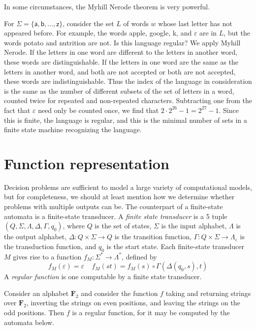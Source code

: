 In some circumstances, the Myhill Nerode theorem is very powerful.

\begin{example}
    For $\Sigma = \{ \mathsf{a, b, }\dots\mathsf{, z} \}$, consider the set $L$ of words $w$ whose last letter has not appeared before. For example, the words \textsf{apple}, \textsf{google}, \textsf{k}, and $\varepsilon$ are in $L$, but the words \textsf{potato} and \textsf{nutrition} are not. Is this language regular? We apply Myhill Nerode. If the letters in one word are different to the letters in another word, these words are distinguishable. If the letters in one word are the same as the letters in another word, and both are not accepted or both are not accepted, these words are indistinguishable. Thus the index of the language in consideration is the same as the number of different subsets of the set of letters in a word, counted twice for repeated and non-repeated characters. Subtracting one from the fact that $\varepsilon$ need only be counted once, we find that $2 \cdot 2^{26} - 1 = 2^{27} - 1$. Since this is finite, the language is regular, and this is the minimal number of sets in a finite state machine recognizing the language.
\end{example}

\section{Function representation}

Decision problems are sufficient to model a large variety of computational models, but for completeness, we should at least mention how we determine whether problems with multiple outputs can be. The counterpart of a finite-state automata is a finite-state transducer. A \emph{finite state transducer} is a 5 tuple $(Q, \Sigma, \Lambda, \Delta, \Gamma, q_0)$, where $Q$ is the set of states, $\Sigma$ is the input alphabet, $\Lambda$ is the output alphabet, $\Delta: Q \times \Sigma \to Q$ is the transition function, $\Gamma: Q \times \Sigma \to \Lambda_\varepsilon$ is the transduction function, and $q_0$ is the start state. Each finite-state transducer $M$ gives rise to a function $f_M: \Sigma^* \to \Lambda^*$, defined by
%
\[ f_M(\varepsilon) = \varepsilon\ \ \ \ \ f_M(st) = f_M(s) \circ \Gamma(\Delta(q_0,s), t) \]
%
A \emph{regular function} is one computable by a finite state transducer.

\begin{example}
    Consider an alphabet $\mathbf{F}_2$ and consider the function $f$ taking and returning strings over $\mathbf{F}_2$, inverting the strings on even positions, and leaving the strings on the odd positions. Then $f$ is a regular function, for it may be computed by the automata below.
\end{example}










